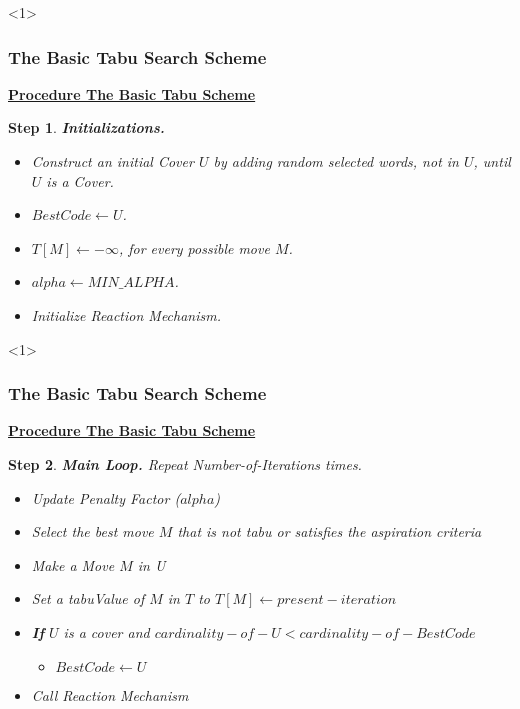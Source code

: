 \documentclass{beamer}
\newtheorem{step}{Step}
\begin{document}
\begin{frame}<1>
  \frametitle{The Basic Tabu Search Scheme}

{ \footnotesize

\begin{block}

\underline{\bf Procedure The Basic Tabu Scheme}

\begin{step} {\bf Initializations.}
\begin{itemize}
    \item[-] Construct an initial Cover $U$ by adding random selected words, not in $U$, until $U$ is a Cover.
    \item[-] $BestCode \leftarrow U$.
    \item[-] $T[M] \leftarrow -\infty$, for every possible move $M$.
    \item[-] $alpha \leftarrow MIN\_ALPHA$.
    \item[-] Initialize Reaction Mechanism.
\end{itemize}
\end{step}

\end{block}

}

\end{frame}


\begin{frame}<1>
  \frametitle{The Basic Tabu Search Scheme}

{ \footnotesize

\begin{block}

\underline{\bf Procedure The Basic Tabu Scheme}

\begin{step} {\bf Main Loop.} Repeat {\sc Number-of-Iterations} times.
\begin{itemize}
    \item[-] Update Penalty Factor ($alpha$)
    \item[-] Select the best move $M$ that is not tabu or satisfies the aspiration criteria
    \item[-] Make a Move $M$ in U
    \item[-] Set a tabuValue of $M$ in $T$ to $T[M]  \leftarrow present-iteration$
    \item[-] \textbf{If} $U$ is a cover and $cardinality-of-U < cardinality-of-BestCode$
        \begin{itemize}
        \item[-] $BestCode \leftarrow U$
        \end{itemize}
    \item[-] Call Reaction Mechanism
\end{itemize}
\end{step}

\end{block}

}

\end{frame}
\end{document}
